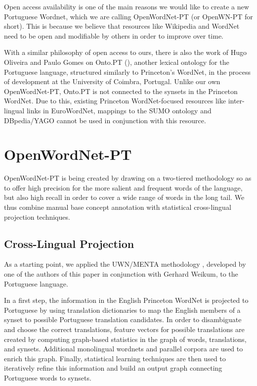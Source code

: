 \documentclass[a4paper,twocolumn]{article}
\begin{document}
Open access availability is one of the main reasons we would like to
create a new Portuguese Wordnet, which we are calling OpenWordNet-PT
(or OpenWN-PT for short). This is because we believe that resources
like Wikipedia and WordNet need to be open and modifiable by others in
order to improve over time.

With a similar philosophy of open access to ours, there is also the
work of Hugo Oliveira and Paulo Gomes on Onto.PT (\cite{ontoPT}),
another lexical ontology for the Portuguese language, structured
similarly to Princeton's WordNet, in the process of development at the
University of Coimbra, Portugal. Unlike our own OpenWordNet-PT,
Onto.PT is not connected to the synsets in the  Princeton WordNet. 
Due to this, existing Princeton WordNet-focused resources like
inter-lingual links in EuroWordNet, mappings to the SUMO ontology and
DBpedia/YAGO cannot be used in conjunction with this resource.

\section{OpenWordNet-PT}

OpenWordNet-PT is being created by drawing on a two-tiered methodology
so as to offer high precision for the more salient and frequent words
of the language, but also high recall in order to cover a wide range
of words in the long tail. We thus combine manual base concept
annotation with statistical cross-lingual projection techniques.

\subsection{Cross-Lingual Projection}

As a starting point, we applied the UWN/MENTA methodology
\cite{deMelo2009,de2010menta}, developed by one of the authors of this
paper in conjunction with Gerhard Weikum, to the Portuguese language.

In a first step, the information in the English Princeton WordNet is
projected to Portuguese by using translation dictionaries to map the
English members of a synset to possible Portuguese translation
candidates. In order to disambiguate and choose the correct
translations, feature vectors for possible translations are created by
computing graph-based statistics in the graph of words, translations,
and synsets. Additional monolingual wordnets and parallel corpora are
used to enrich this graph. Finally, statistical learning techniques
are then used to iteratively refine this information and build an
output graph connecting Portuguese words to synsets.
\end{document}
